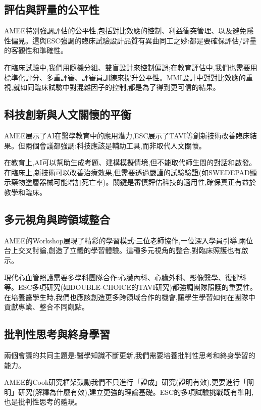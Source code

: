 \documentclass[12pt,a4paper]{article}
\begin{document}
\subsection{評估與評量的公平性}

AMEE特別強調評估的公平性,包括對比效應的控制、利益衝突管理、以及避免隱性偏見。這與ESC強調的臨床試驗設計品質有異曲同工之妙:都是要確保評估/評量的客觀性和準確性。

在臨床試驗中,我們用隨機分組、雙盲設計來控制偏誤;在教育評估中,我們也需要用標準化評分、多重評審、評審員訓練來提升公平性。MMI設計中對對比效應的重視,就如同臨床試驗中對混雜因子的控制,都是為了得到更可信的結果。

\subsection{科技創新與人文關懷的平衡}

AMEE展示了AI在醫學教育中的應用潛力,ESC展示了TAVI等創新技術改善臨床結果。但兩個會議都強調:科技應該是輔助工具,而非取代人文關懷。

在教育上,AI可以幫助生成考題、建構模擬情境,但不能取代師生間的對話和啟發。在臨床上,新技術可以改善治療效果,但需要透過嚴謹的試驗驗證(如SWEDEPAD顯示藥物塗層器械可能增加死亡率)。關鍵是審慎評估科技的適用性,確保真正有益於教學和臨床。

\subsection{多元視角與跨領域整合}

AMEE的Workshop展現了精彩的學習模式:三位老師協作,一位深入學員引導,兩位台上交叉討論,創造了立體的學習體驗。這種多元視角的整合,對臨床照護也有啟示。

現代心血管照護需要多學科團隊合作:心臟內科、心臟外科、影像醫學、復健科等。ESC多項研究(如DOUBLE-CHOICE的TAVI研究)都強調團隊照護的重要性。在培養醫學生時,我們也應該創造更多跨領域合作的機會,讓學生學習如何在團隊中貢獻專業、整合不同觀點。

\subsection{批判性思考與終身學習}

兩個會議的共同主題是:醫學知識不斷更新,我們需要培養批判性思考和終身學習的能力。

AMEE的Cook研究框架鼓勵我們不只進行「證成」研究(證明有效),更要進行「闡明」研究(解釋為什麼有效),建立更強的理論基礎。ESC的多項試驗挑戰既有準則,也是批判性思考的體現。
\end{document}
